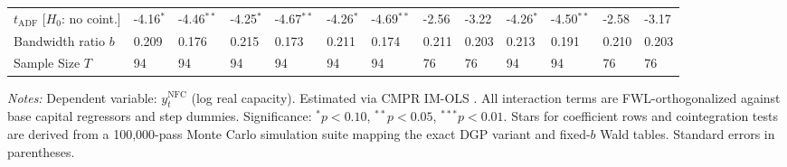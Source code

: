 \begin{table}[h!]
\begin{tabular}{p{3.2cm}p{1.0cm}p{1.0cm}p{1.0cm}p{1.0cm}p{1.0cm}p{1.0cm}p{1.0cm}p{1.0cm}p{1.0cm}p{1.0cm}p{1.0cm}p{1.0cm}}
		$t_{\text{ADF}}$ [$H_0$: no coint.] & -4.16$^{*}$ & -4.46$^{**}$ & -4.25$^{*}$ & -4.67$^{**}$ & -4.26$^{*}$ & -4.69$^{**}$ & -2.56 & -3.22 & -4.26$^{*}$ & -4.50$^{**}$ & -2.58 & -3.17 \\
		Bandwidth ratio $b$ & 0.209 & 0.176 & 0.215 & 0.173 & 0.211 & 0.174 & 0.211 & 0.203 & 0.213 & 0.191 & 0.210 & 0.203 \\
		Sample Size $T$ & 94 & 94 & 94 & 94 & 94 & 94 & 76 & 76 & 94 & 94 & 76 & 76 \\
		\bottomrule
	\end{tabular}
	\begin{minipage}{\textwidth}
		\scriptsize
		\textit{Notes:} Dependent variable: $y_t^{\text{NFC}}$ (log real capacity). Estimated via CMPR IM-OLS \citep{VogelsangWagner2024}. All interaction terms are FWL-orthogonalized against base capital regressors and step dummies. Significance: $^*p<0.10$, $^{**}p<0.05$, $^{***}p<0.01$. Stars for coefficient rows and cointegration tests are derived from a 100,000-pass Monte Carlo simulation suite mapping the exact DGP variant and fixed-$b$ Wald tables. Standard errors in parentheses.
	\end{minipage}
\end{table}



